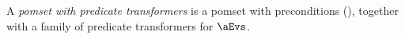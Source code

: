 \begin{definition}
  A \emph{pomset with predicate transformers} is a pomset with preconditions (),
  together with a family of predicate transformers for $\aEvs$.
\end{definition}
\begin{comment}
  Let $\PomTrans$ be the set of all pomsets with predicate transformers.
  We can covert between pomsets with preconditions and pomsets with predicate
  transformers. In one direction, $\sTHREAD{}:2^{\PomTrans}\fun2^{\PomPre}$
  drops predicate transformers, and in the other,
  $\sFORK{}:2^{\PomPre}\fun2^{\PomTrans}$ adopts the identity transformer.

  \begin{definition}
    \label{def:pomsets-group}
    \noindent
    If $\aPS \in \sTHREAD{\aPSS}$ then
    $(\exists\aPS_1\in\aPSS)$
    \begin{enumerate}[topsep=0pt]
    \item  \label{thread-E} %
      $\aEvs=\aEvs_1$,
    \item  \label{thread-lambda} %
      $\labelingAct(\aEv) = \labelingAct_1(\aEv)$,
    \item \label{thread-le} %
      if $\bEv\le_1\aEv$ then $\bEv\le\aEv$,
    \item  \label{thread-kappa}\label{T3} %
      $\labelingForm(\aEv)$ implies $\labelingForm_1(\aEv)$.
      \newcounter{pomsetXThreadCount}
      \setcounter{pomsetXThreadCount}{\value{enumi}}
    \end{enumerate}  

    \noindent
    If $\aPS \in \sFORK{\aPSS}$ then
    $(\exists\aPS_1\in\aPSS)$
    \begin{enumerate}[topsep=0pt]
    \item \label{fork-E} %
      $\aEvs=\aEvs_1$,
    \item  \label{fork-lambda} %
      $\labelingAct(\aEv) = \labelingAct_1(\aEv)$,
    \item \label{fork-le} %
      if $\bEv\le_1\aEv$ then $\bEv\le\aEv$,
      \newcounter{pomsetXForkCount}
      \setcounter{pomsetXForkCount}{\value{enumi}}
    \item  \label{fork-kappa}\label{F3}  %
      $\labelingForm(\aEv)$ implies $\labelingForm_1(\aEv)$, 
    \item  \label{fork-tau}\label{F4}  %
      $\aTr{\bEvs}{\bForm}$ implies $\bForm$.
    \end{enumerate}  
  \end{definition}


\end{comment}
